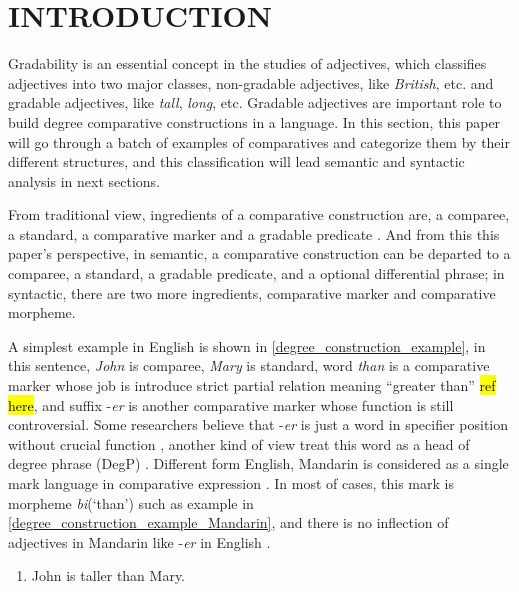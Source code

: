 \documentclass{ctexart}
\let \cite \parencite
\begin{document}
\thispagestyle{empty} %

\newpage

\section{INTRODUCTION}

\setcounter{page}{1}

\noindent
Gradability is an essential concept in the studies of adjectives, which classifies adjectives into two major classes, non-gradable adjectives, like \textit{British}, etc. and gradable adjectives, like \textit{tall}, \textit{long}, etc. Gradable adjectives are important role to build degree comparative constructions in a language. In this section, this paper will go through a batch of examples of comparatives and categorize them by their different structures, and this classification will lead semantic and syntactic analysis in next sections. 

From traditional view, ingredients of a comparative construction are, a comparee, a standard, a comparative marker and a gradable predicate \cite{guo2012}. And from this this paper's perspective, in semantic, a comparative construction can be departed to a comparee, a standard, a gradable predicate, and a optional differential phrase; in syntactic, there are two more ingredients, comparative marker and comparative morpheme.

A simplest example in English is shown in \ref{degree_construction_example}, in this sentence, \textit{John} is comparee, \textit{Mary} is standard, word \textit{than} is a comparative marker whose job is introduce strict partial relation meaning ``greater than'' \hl{ref here}, and suffix -\textit{er} is another comparative marker whose function is still controversial. Some researchers believe that -\textit{er} is just a word in specifier position without crucial function \cite{von1984a,heim1985,bhatt2004,rullmann1995}, another kind of view treat this word as a head of degree phrase (DegP) \cite{bierwisch1989,corver1990,corver1993,corver1997a,kennedy1997,grano2012}. Different form English, Mandarin is considered as a single mark language in comparative expression \cite{bobaljik2012,grano2012}. In most of cases, this mark is morpheme \textit{bi}(`than') such as example in \ref{degree_construction_example_Mandarin}, and there is no inflection of adjectives in Mandarin like -\textit{er} in English \cite{guo2012}. 

\begin{enumerate}
    \item \label{degree_construction_example}
    John is taller than Mary.
\end{enumerate}
\end{document}

